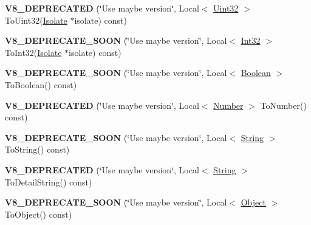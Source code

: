 \begin{DoxyCompactItemize}
\item 
{\bfseries V8\+\_\+\+D\+E\+P\+R\+E\+C\+A\+T\+ED} (\char`\"{}Use maybe version\char`\"{}, Local$<$ \hyperlink{classv8_1_1Uint32}{Uint32} $>$ To\+Uint32(\hyperlink{classv8_1_1Isolate}{Isolate} $\ast$isolate) const)\hypertarget{classv8_1_1Value_a1582d050951071123139095fa6696e6b}{}\label{classv8_1_1Value_a1582d050951071123139095fa6696e6b}

\item 
{\bfseries V8\+\_\+\+D\+E\+P\+R\+E\+C\+A\+T\+E\+\_\+\+S\+O\+ON} (\char`\"{}Use maybe version\char`\"{}, Local$<$ \hyperlink{classv8_1_1Int32}{Int32} $>$ To\+Int32(\hyperlink{classv8_1_1Isolate}{Isolate} $\ast$isolate) const)\hypertarget{classv8_1_1Value_abf72660ee84f81fe2fed85e39e6a3c86}{}\label{classv8_1_1Value_abf72660ee84f81fe2fed85e39e6a3c86}

\item 
{\bfseries V8\+\_\+\+D\+E\+P\+R\+E\+C\+A\+T\+E\+\_\+\+S\+O\+ON} (\char`\"{}Use maybe version\char`\"{}, Local$<$ \hyperlink{classv8_1_1Boolean}{Boolean} $>$ To\+Boolean() const)\hypertarget{classv8_1_1Value_a4c9960d9a42b62b83d70ade47d88fa52}{}\label{classv8_1_1Value_a4c9960d9a42b62b83d70ade47d88fa52}

\item 
{\bfseries V8\+\_\+\+D\+E\+P\+R\+E\+C\+A\+T\+ED} (\char`\"{}Use maybe version\char`\"{}, Local$<$ \hyperlink{classv8_1_1Number}{Number} $>$ To\+Number() const)\hypertarget{classv8_1_1Value_a82d85e91f204bbfcb5299f20158c27c7}{}\label{classv8_1_1Value_a82d85e91f204bbfcb5299f20158c27c7}

\item 
{\bfseries V8\+\_\+\+D\+E\+P\+R\+E\+C\+A\+T\+E\+\_\+\+S\+O\+ON} (\char`\"{}Use maybe version\char`\"{}, Local$<$ \hyperlink{classv8_1_1String}{String} $>$ To\+String() const)\hypertarget{classv8_1_1Value_a4d1fe1c6d7ba6cccef24fc3fe528d75a}{}\label{classv8_1_1Value_a4d1fe1c6d7ba6cccef24fc3fe528d75a}

\item 
{\bfseries V8\+\_\+\+D\+E\+P\+R\+E\+C\+A\+T\+ED} (\char`\"{}Use maybe version\char`\"{}, Local$<$ \hyperlink{classv8_1_1String}{String} $>$ To\+Detail\+String() const)\hypertarget{classv8_1_1Value_a963462b3b958c27890253a6e2b35f565}{}\label{classv8_1_1Value_a963462b3b958c27890253a6e2b35f565}

\item 
{\bfseries V8\+\_\+\+D\+E\+P\+R\+E\+C\+A\+T\+E\+\_\+\+S\+O\+ON} (\char`\"{}Use maybe version\char`\"{}, Local$<$ \hyperlink{classv8_1_1Object}{Object} $>$ To\+Object() const)\hypertarget{classv8_1_1Value_a594821f24e204aa6a7b1f003a79089a5}{}\label{classv8_1_1Value_a594821f24e204aa6a7b1f003a79089a5}


\end{DoxyCompactItemize}
